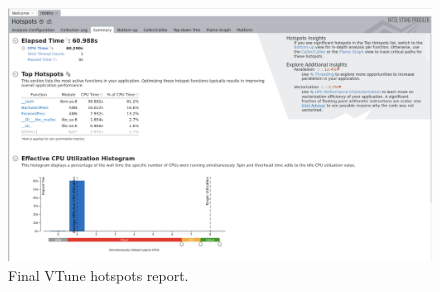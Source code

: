 \documentclass[12pt]{article}
\begin{document}
\begin{figure}[h]
    \centering
    \includegraphics[width=\textwidth]{Figure7.png}
    \caption{Final VTune hotspots report.}
    \label{fig:figure7}
\end{figure}
\end{document}

